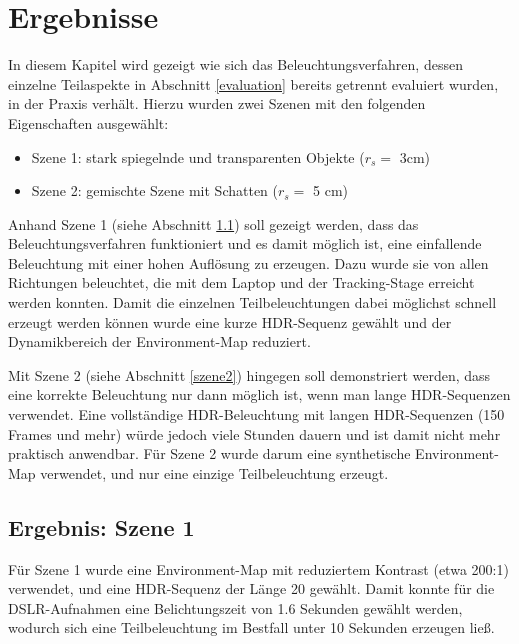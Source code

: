 \chapter{Ergebnisse}
   In diesem Kapitel wird gezeigt wie sich das Beleuchtungsverfahren, dessen einzelne Teilaspekte in Abschnitt \ref{evaluation} bereits getrennt evaluiert wurden, in der Praxis verhält.
   Hierzu wurden zwei Szenen mit den folgenden Eigenschaften ausgewählt:
   \begin{itemize}
    \item{Szene 1: stark spiegelnde und transparenten Objekte ($r_s=$ 3cm)}
    \item{ Szene 2: gemischte Szene mit Schatten ($r_s=$ 5 cm)}
   \end{itemize}
   
  Anhand Szene 1 (siehe Abschnitt \ref{szene1}) soll gezeigt werden, dass das Beleuchtungsverfahren funktioniert und es damit möglich ist, eine einfallende Beleuchtung mit einer hohen Auflösung zu erzeugen.
  Dazu wurde sie von allen Richtungen beleuchtet, die mit dem Laptop und der Tracking-Stage erreicht werden konnten.
  Damit die einzelnen Teilbeleuchtungen dabei möglichst schnell erzeugt werden können wurde eine kurze HDR-Sequenz gewählt und der Dynamikbereich der Environment-Map reduziert.
  
  Mit Szene 2 (siehe Abschnitt \ref{szene2}) hingegen soll demonstriert werden, dass eine korrekte Beleuchtung nur dann möglich ist, wenn man lange HDR-Sequenzen verwendet. 
  Eine vollständige HDR-Beleuchtung mit langen HDR-Sequenzen (150 Frames und mehr) würde jedoch viele Stunden dauern und ist damit nicht mehr praktisch anwendbar. 
  Für Szene 2 wurde darum eine synthetische Environment-Map verwendet, und nur eine einzige Teilbeleuchtung erzeugt.
   

\section {Ergebnis: Szene 1} \label{szene1}

   Für Szene 1 wurde eine Environment-Map mit reduziertem Kontrast (etwa 200:1) verwendet, und eine HDR-Sequenz der Länge 20 gewählt.
   Damit konnte für die DSLR-Aufnahmen eine Belichtungszeit von  1.6 Sekunden gewählt werden, wodurch sich eine Teilbeleuchtung im Bestfall unter 10 Sekunden erzeugen ließ.
   
